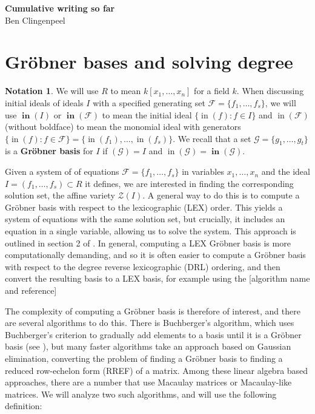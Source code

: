 \documentclass[11pt]{article}
\newcommand{\F}{\mathcal{F}}
\DeclareMathOperator{\init}{in}
\DeclareMathOperator{\Init}{\mathbf{in}}
\theoremstyle{definition}
\newtheorem*{notation}{Notation}
\begin{document}
\begin{center}
	\Huge{\textbf{Cumulative writing so far}}\\
	\vspace{.5em}
	\normalsize{Ben Clingenpeel}
\end{center}

\section{Gröbner bases and solving degree}

\begin{notation}
	We will use $R$ to mean $k[x_1, \dots, x_n]$ for a field $k$. When discussing initial ideals of ideals $I$ with a specified generating set $\F = \{f_1, \dots, f_s\}$, we will use $\Init(I)$ or $\Init(\F)$ to mean the initial ideal $\{\init(f): f \in I\}$ and $\init(\F)$ (without boldface) to mean the monomial ideal with generators $\{\init(f): f \in \F\} = \{\init(f_1), \dots, \init(f_s)\}$. We recall that a set $\mathcal{G} = \{g_1, \dots, g_t\}$ is a \textbf{Gröbner basis} for $I$ if $(\mathcal{G}) = I$ and $\init(\mathcal{G}) = \Init(\mathcal{G})$.
\end{notation}

Given a system of of equations $\mathcal{F} = \{f_1, \dots, f_s\}$ in variables $x_1, \dots, x_n$ and the ideal $I = (f_1, \dots, f_s) \subset R$ it defines, we are interested in finding the corresponding solution set, the affine variety $\mathcal{Z}(I)$. A general way to do this is to compute a Gröbner basis with respect to the lexicographic (LEX) order. This yields a system of equations with the same solution set, but crucially, it includes an equation in a single variable, allowing us to solve the system. This approach is outlined in section 2 of \cite{caminata2020solving}. In general, computing a LEX Gröbner basis is more computationally demanding, and so it is often easier to compute a Gröbner basis with respect to the degree reverse lexicographic (DRL) ordering, and then convert the resulting basis to a LEX basis, for example using the \color{red} [algorithm name and reference] \color{black}

The complexity of computing a Gröbner basis is therefore of interest, and there are several algorithms to do this. There is Buchberger's algorithm, which uses Buchberger's criterion to gradually add elements to a basis until it is a Gröbner basis (see \cite{cox2013ideals}), but many faster algorithms take an approach based on Gaussian elimination, converting the problem of finding a Gröbner basis to finding a reduced row-echelon form (RREF) of a matrix. Among these linear algebra based approaches, there are a number that use Macaulay matrices or Macaulay-like matrices. We will analyze two such algorithms, and will use the following definition:
\end{document}
